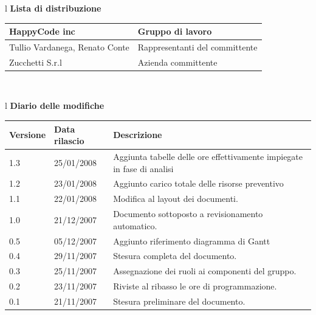 \documentclass[11pt,titlepage,a4paper]{report}
\begin{document}
\begin{center}
\begin{table}[hbtp]
\large{
\begin{tabular}{l}
\Large{\textbf{\textsf{Lista di distribuzione}}} \\
\begin{tabular}{||p{6cm}||p{6cm}||} \hline
{HappyCode inc}& Gruppo di lavoro\\ \hline
{Tullio Vardanega, Renato Conte}& Rappresentanti del committente \\ \hline 
{Zucchetti S.r.l}& Azienda committente\\ \hline
\end{tabular} \\
\end{tabular}
}
\end{table}
\begin{table}[hbtp]
\large{
\begin{tabular}{l}
\Large{\textbf{\textsf{Diario delle modifiche}}} \\
\begin{tabular}{||p{2cm}||p{3.5cm}||p{6cm}||}
\hline
\textbf{Versione} & \textbf{Data rilascio} & \textbf{Descrizione} \\ \hline
1.3 & 25/01/2008 & Aggiunta tabelle delle ore effettivamente impiegate in fase di analisi \\ \hline
1.2 & 23/01/2008 & Aggiunto carico totale delle risorse preventivo \\ \hline
1.1 & 22/01/2008 & Modifica al layout dei documenti.\\ \hline
1.0 & 21/12/2007 & Documento sottoposto a revisionamento automatico.\\ \hline
0.5 & 05/12/2007 & Aggiunto riferimento diagramma di Gantt \\ \hline
0.4 & 29/11/2007 & Stesura completa del documento. \\ \hline
0.3 & 25/11/2007 & Assegnazione dei ruoli ai componenti del gruppo. \\ \hline
0.2 & 23/11/2007 & Riviste al ribasso le ore di programmazione. \\ \hline
0.1 & 21/11/2007 & Stesura preliminare del documento. \\ \hline

\end{tabular} \\
\end{tabular}

}
\end{table}
\end{center}
\end{document}
